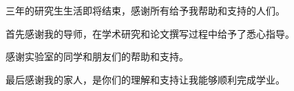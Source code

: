 
\acknowledgement

三年的研究生生活即将结束，感谢所有给予我帮助和支持的人们。

首先感谢我的导师，在学术研究和论文撰写过程中给予了悉心指导。

感谢实验室的同学和朋友们的帮助和支持。

最后感谢我的家人，是你们的理解和支持让我能够顺利完成学业。
